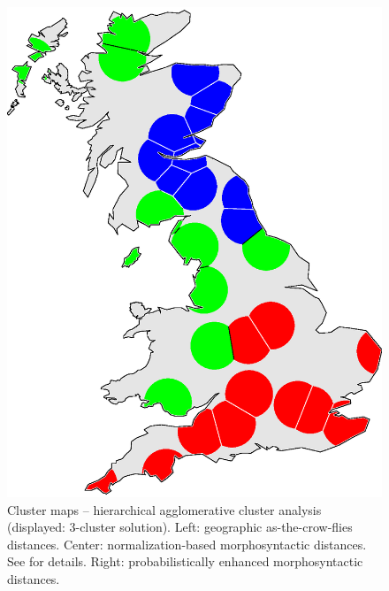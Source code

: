 \documentclass[output=paper]{LSP/langsci}
\begin{document}
\begin{figure} [tbp]
\begin{minipage}[b]{0.30\linewidth}
    \includegraphics [keepaspectratio,width=.98\textwidth] {illustrations/wolk_noisy_cluster_gam_r2-3groups.eps}
\end{minipage}
\caption{Cluster maps -- hierarchical agglomerative cluster analysis (displayed: 3-cluster solution). Left: geographic as-the-crow-flies distances. Center: normalization-based morphosyntactic distances. See \citet[chapter 6]{szmrecsanyi_grammatical_2013} for details. Right: probabilistically enhanced morphosyntactic distances.} \label{clustermapsfig}
\end{figure}
\end{document}
